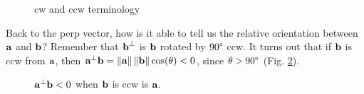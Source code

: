 \documentclass[a4paper]{article}
\begin{document}
\begin{figure}[H]
    \centering
    \qquad
    \caption{cw and ccw terminology}%
    \label{fig:cw_ccw_terms}%
\end{figure}

Back to the perp vector, how is it able to tell us the relative orientation between $\textbf{a}$ and $\textbf{b}$? Remember that $\textbf{b}^{\bot}$ is $\textbf{b}$ rotated by $90\degree$ ccw. It turns out that if $\textbf{b}$
 is ccw from $\textbf{a}$, then $\textbf{a}^{\bot}\textbf{b} = \left\lVert\textbf{a}\right\rVert\left\lVert\textbf{b}\right\rVert\cos(\theta) < 0$, since $\theta > 90\degree$ (Fig. \ref{fig:b_ccw_a_sign_pdot}).
 
\begin{figure}[H]
    \centering
    \qquad
    \caption{$\textbf{a}^{\bot}\textbf{b} <0$ when $\textbf{b}$ is ccw is $\textbf{a}$.}%
    \label{fig:b_ccw_a_sign_pdot}%
\end{figure}
\end{document}
